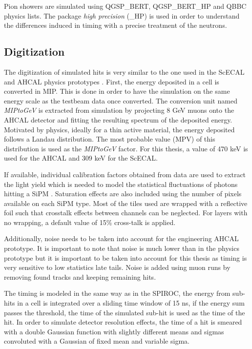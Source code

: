 Pion showers are simulated using QGSP\_BERT, QGSP\_BERT\_HP and QBBC physics lists. The package \textit{high precision} (\_HP) is used in order to understand the differences induced in timing with a precise treatment of the neutrons.

\subsection{Digitization}

The digitization of simulated hits is very similar to the one used in the ScECAL and AHCAL physics prototypes \cite{2011_JINST_6_P04003}. First, the energy deposited in a cell is converted in MIP. This is done in order to have the simulation on the same energy scale as the testbeam data once converted. The conversion unit named \textit{MIPtoGeV} is extracted from simulation by projecting 8 GeV muons onto the AHCAL detector and fitting the resulting spectrum of the deposited energy. Motivated by physics, ideally for a thin active material, the energy deposited follows a Landau distribution. The most probable value (MPV) of this distribution is used as the \textit{MIPtoGeV} factor. For this thesis, a value of 470 keV is used for the AHCAL and 309 keV for the ScECAL.

If available, individual calibration factors obtained from data are used to extract the light yield which is needed to model the statistical fluctuations of photons hitting a SiPM \cite{Hartbrich:2016bbz}. Saturation effects are also included using the number of pixels available on each SiPM type. Most of the tiles used are wrapped with a reflective foil such that crosstalk effects between channels can be neglected. For layers with no wrapping, a default value of 15\% cross-talk is applied.

Additionally, noise needs to be taken into account for the engineering AHCAL prototype. It is important to note that noise is much lower than in the physics prototype but it is important to be taken into account for this thesis as timing is very sensitive to low statistics late tails. Noise is added using muon runs by removing found tracks and keeping remaining hits.

The timing is modeled in the same way as in the SPIROC, the energy from sub-hits in a cell is integrated over a sliding time window of 15 ns, if the energy sum passes the threshold, the time of the simulated sub-hit is used as the time of the hit. In order to simulate detector resolution effects, the time of a hit is smeared with a double Gaussian function with slightly different means and sigmas convoluted with a Gaussian of fixed mean and variable sigma.

